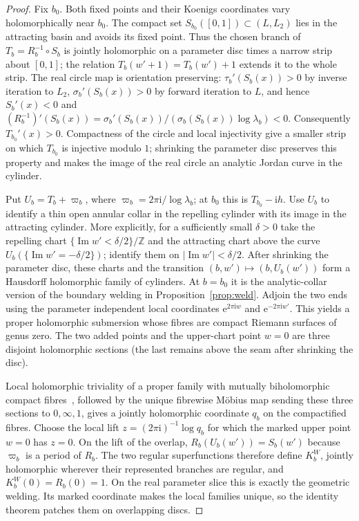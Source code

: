 \documentclass[11pt,a4paper]{article}
\theoremstyle{definition}
\newcommand{\Rr}{R}
\newcommand{\Kk}{K}
\newcommand{\eee}{\mathrm{e}}
\newcommand{\ii}{\mathrm{i}}
\begin{document}
\begin{proof}
Fix $b_0$.  Both fixed points and their Koenigs coordinates vary
holomorphically near $b_0$.  The compact set
$S_{b_0}([0,1])\subset(L,L_2)$ lies in the attracting basin and avoids its
fixed point.  Thus the chosen branch of
$T_b=\Rr_b^{-1}\circ S_b$ is jointly holomorphic on a parameter disc times
a narrow strip about $[0,1]$; the relation $T_b(w'+1)=T_b(w')+1$
extends it to the whole strip.  The real circle map is orientation
preserving: $\tau_b'(S_b(x))>0$ by inverse iteration to $L_2$,
$\sigma_b'(S_b(x))>0$ by forward iteration to $L$, and hence
$S_b'(x)<0$ and
$(\Rr_b^{-1})'(S_b(x))=\sigma_b'(S_b(x))/
 (\sigma_b(S_b(x))\log\lambda_b)<0$.
Consequently $T_{b_0}'(x)>0$.  Compactness of the circle and local
injectivity give a smaller strip on which $T_{b_0}$ is injective modulo
$1$; shrinking the parameter disc preserves this property and makes the
image of the real circle an analytic Jordan curve in the cylinder.

Put $U_b=T_b+\varpi_b$, where
$\varpi_b=2\pi\ii/\log\lambda_b$; at $b_0$ this is $T_{b_0}-\ii h$.
Use $U_b$ to identify a thin open annular collar in the repelling
cylinder with its image in the attracting cylinder.  More explicitly,
for a sufficiently small $\delta>0$ take the repelling chart
$\{\operatorname{Im}w'<\delta/2\}/\mathbb Z$ and the attracting chart
above the curve $U_b(\{\operatorname{Im}w'=-\delta/2\})$; identify them
on $|\operatorname{Im}w'|<\delta/2$.  After shrinking the parameter disc,
these charts and the transition $(b,w')\mapsto(b,U_b(w'))$ form a
Hausdorff holomorphic family of cylinders.  At $b=b_0$ it is the
analytic-collar version of the boundary welding in
Proposition~\ref{prop:weld}.  Adjoin the two ends using the parameter
independent local coordinates $\eee^{2\pi\ii w}$ and
$\eee^{-2\pi\ii w'}$.  This yields a proper holomorphic submersion
whose fibres are compact Riemann surfaces of genus zero.  The two added
points and the upper-chart point $w=0$ are three disjoint holomorphic
sections (the last remains above the seam after shrinking the disc).

Local holomorphic triviality of a proper family with mutually
biholomorphic compact fibres~\cite{FischerGrauert1965}, followed by the
unique fibrewise M\"obius map sending these three sections to $0,\infty,1$,
gives a jointly holomorphic coordinate $q_b$ on the compactified fibres.
Choose the local lift $z=(2\pi\ii)^{-1}\log q_b$ for which the marked
upper point $w=0$ has $z=0$.  On the lift of the overlap,
$\Rr_b(U_b(w'))=S_b(w')$ because $\varpi_b$ is a period of $\Rr_b$.
The two regular superfunctions therefore define $\Kk_b^W$, jointly
holomorphic wherever their represented branches are regular, and
$\Kk_b^W(0)=\Rr_b(0)=1$.  On the real parameter slice this is exactly
the geometric welding.  Its marked coordinate makes the local families
unique, so the identity theorem patches them on overlapping discs.
\end{proof}
\end{document}
